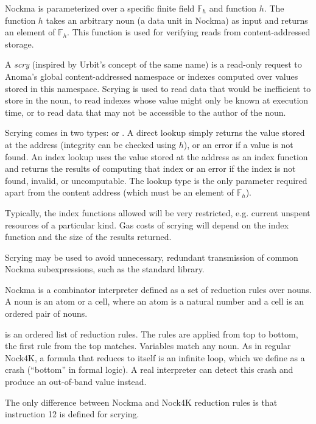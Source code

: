 \documentclass[
    11pt,            %
    techreport,        %
    affiltop,       %
]{art}
\begin{document}
Nockma is parameterized over a specific finite field $\mathbb{F}_h$ and function $h$. The function $h$ takes an arbitrary noun (a data unit in Nockma) as input and returns an element of $\mathbb{F}_h$. This function is used for verifying reads from content-addressed storage.

A \textit{scry} (inspired by Urbit’s concept of the same name) is a read-only request to Anoma’s global content-addressed namespace or indexes computed over values stored in this namespace. Scrying is used to read data that would be inefficient to store in the noun, to read indexes whose value might only be known at execution time, or to read data that may not be accessible to the author of the noun.

Scrying comes in two types:  or . A direct lookup simply returns the value stored at the address (integrity can be checked using $h$), or an error if a value is not found. An index lookup uses the value stored at the address as an index function and returns the results of computing that index or an error if the index is not found, invalid, or uncomputable. The lookup type is the only parameter required apart from the content address (which must be an element of $\mathbb{F}_h$).

Typically, the index functions allowed will be very restricted, e.g. current unspent resources of a particular kind. Gas costs of scrying will depend on the index function and the size of the results returned.

Scrying may be used to avoid unnecessary, redundant transmission of common Nockma subexpressions, such as the standard library.


Nockma is a combinator interpreter defined as a set of reduction rules over nouns. A noun is an atom or a cell, where an atom is a natural number and a cell is an ordered pair of nouns. 

 is an ordered list of reduction rules. The rules are applied from top to bottom, the first rule from the top matches. Variables match any noun. As in regular Nock4K, a formula that reduces to itself is an infinite loop, which we define as a crash (“bottom” in formal logic). A real interpreter can detect this crash and produce an out-of-band value instead.

The only difference between Nockma and Nock4K reduction rules is that instruction 12 is defined for scrying.
\end{document}
